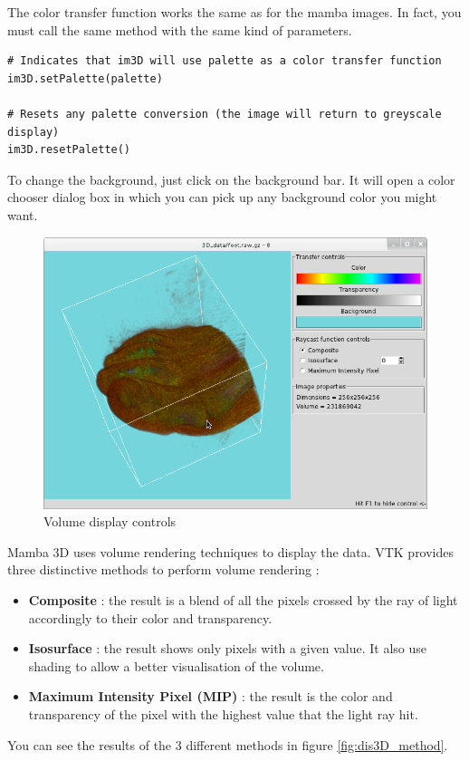 \documentclass[a4paper,10pt,oneside]{article}
\begin{document}
The color transfer function works the same as for the mamba images. In fact, you
must call the same method with the same kind of parameters.

\lstset{language=Python}
\begin{lstlisting}
# Indicates that im3D will use palette as a color transfer function
im3D.setPalette(palette)

# Resets any palette conversion (the image will return to greyscale display)
im3D.resetPalette()
\end{lstlisting}

To change the background, just click on the background bar. It will open a
color chooser dialog box in which you can pick up any background color you
might want.

\begin{figure}
\centering
\includegraphics[scale=0.5]{images/display_ctrl.png}
\caption{Volume display controls}
\label{fig:dis3D_ctrl}
\end{figure}

Mamba 3D uses volume rendering techniques to display the data. VTK provides
three distinctive methods to perform volume rendering :
\begin{itemize}
\item \textbf{Composite} : the result is a blend of all the pixels crossed by
the ray of light accordingly to their color and transparency.
\item \textbf{Isosurface} : the result shows only pixels with a given
value. It also use shading to allow a better visualisation of the volume.
\item \textbf{Maximum Intensity Pixel (MIP)} : the result is the color and
transparency of the pixel with the highest value that the light ray hit.
\end{itemize}
You can see the results of the 3 different methods in figure 
\ref{fig:dis3D_method}.
\end{document}

